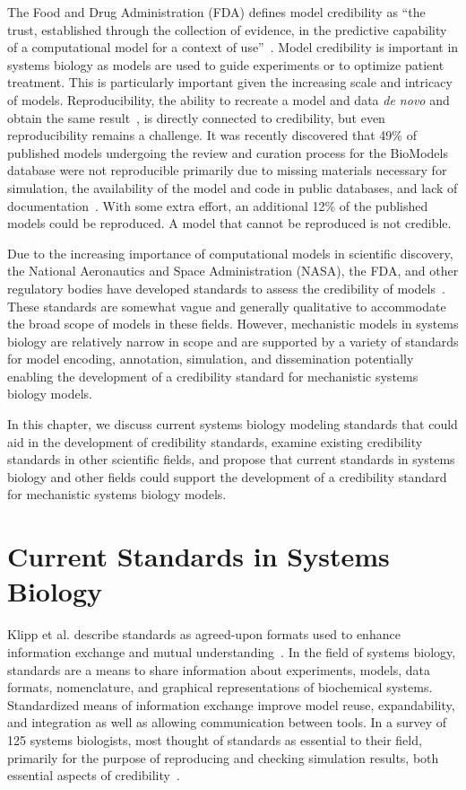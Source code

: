\documentclass[12pt]{report}
\begin{document}
The Food and Drug Administration (FDA) defines model credibility as ``the trust, established through the collection of evidence, in the predictive capability of a computational model for a context of use''~\cite{FDAguidelines}. Model credibility is important in systems biology as models are used to guide experiments or to optimize patient treatment. This is particularly important given the increasing scale and intricacy of models. Reproducibility, the ability to recreate a model and data \textit{de novo} and obtain the same result~\cite{shin_standards_nodate}, is directly connected to credibility, but even reproducibility remains a challenge. It was recently discovered that 49\% of published models undergoing the review and curation process for the BioModels~\cite{BioModels2020} database were not reproducible primarily due to missing materials necessary for simulation, the availability of the model and code in public databases, and lack of documentation~\cite{tiwari_reproducibility_2021}. With some extra effort, an additional 12\% of the published models could be reproduced.  A model that cannot be reproduced is not credible. 

Due to the increasing importance of computational models in scientific discovery, the National Aeronautics and Space Administration (NASA), the FDA, and other regulatory bodies have developed standards to assess the credibility of models~\cite{babula_nasa_2009,FDAguidelines,Shepard2015}. These standards are somewhat vague and generally qualitative to accommodate the broad scope of models in these fields. However, mechanistic models in systems biology are relatively narrow in scope and are supported by a variety of standards for model encoding, annotation, simulation, and dissemination potentially enabling the development of a credibility standard for mechanistic systems biology models.

In this chapter, we discuss current systems biology modeling standards that could aid in the development of credibility standards, examine existing credibility standards in other scientific fields, and propose that current standards in systems biology and other fields could support the development of a credibility standard for mechanistic systems biology models.

\section{Current Standards in Systems Biology}

Klipp et al. describe standards as agreed-upon formats used to enhance information exchange and mutual understanding~\cite{Klipp2007StandardsIC}. In the field of systems biology, standards are a means to share information about experiments, models, data formats, nomenclature, and graphical representations of biochemical systems. Standardized means of information exchange improve model reuse, expandability, and integration as well as allowing communication between tools. In a survey of 125 systems biologists, most thought of standards as essential to their field, primarily for the purpose of reproducing and checking simulation results, both essential aspects of credibility~\cite{Klipp2007StandardsIC}.
\end{document}
